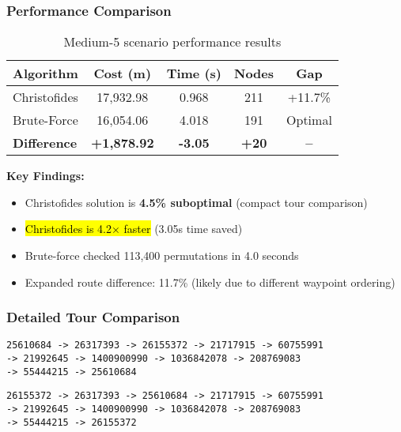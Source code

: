 \documentclass[9pt,a4paper,twoside]{tau}
\begin{document}
\subsubsection{Performance Comparison}

\begin{table}[h]
\centering
\begin{tabular}{@{}lcccc@{}}
\toprule
\textbf{Algorithm} & \textbf{Cost (m)} & \textbf{Time (s)} & \textbf{Nodes} & \textbf{Gap} \\
\midrule
Christofides & 17,932.98 & 0.968 & 211 & +11.7\% \\
Brute-Force & 16,054.06 & 4.018 & 191 & Optimal \\
\midrule
\textbf{Difference} & \textbf{+1,878.92} & \textbf{-3.05} & \textbf{+20} & \textbf{--} \\
\bottomrule
\end{tabular}
\caption{Medium-5 scenario performance results}
\label{tab:medium5}
\end{table}

\textbf{Key Findings:}
\begin{itemize}
    \item Christofides solution is \textbf{4.5\% suboptimal} (compact tour comparison)
    \item \hl{Christofides is 4.2$\times$ faster} (3.05s time saved)
    \item Brute-force checked 113,400 permutations in 4.0 seconds
    \item Expanded route difference: 11.7\% (likely due to different waypoint ordering)
\end{itemize}

\subsubsection{Detailed Tour Comparison}

\begin{lstlisting}[caption={Christofides Tour Order (Medium-5)}]
25610684 -> 26317393 -> 26155372 -> 21717915 -> 60755991 
-> 21992645 -> 1400900990 -> 1036842078 -> 208769083 
-> 55444215 -> 25610684
\end{lstlisting}

\begin{lstlisting}[caption={Optimal Tour Order (Medium-5)}]
26155372 -> 26317393 -> 25610684 -> 21717915 -> 60755991 
-> 21992645 -> 1400900990 -> 1036842078 -> 208769083 
-> 55444215 -> 26155372
\end{lstlisting}
\end{document}
